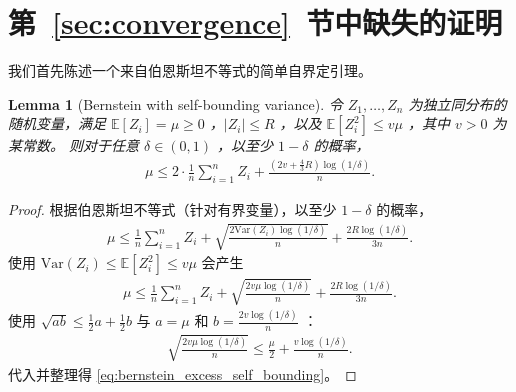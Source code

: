 \documentclass{article}
\theoremstyle{plain}
\newtheorem{lemma}[theorem]{Lemma}
\theoremstyle{definition}
\theoremstyle{remark}
\newcommand{\E}{\mathbb{E}}
\newcommand{\Var}{\mathrm{Var}}
\newcommand{\abs}[1]{\left|#1\right|}
\begin{document}
\section{第~\ref{sec:convergence}~节中缺失的证明}
我们首先陈述一个来自伯恩斯坦不等式的简单自界定引理。

\begin{lemma}[Bernstein with self-bounding variance]\label{lem:bernstein_excess_self_bounding}
    令 $Z_1,\dots,Z_n$ 为独立同分布的随机变量，满足 $\E[Z_i]=\mu\geq 0$ ，$\abs{Z_i}\leq R$ ，以及 $\E[Z_i^2]\leq v\mu$ ，其中 $v>0$ 为某常数。  
则对于任意 $\delta\in(0,1)$ ，以至少 $1-\delta$ 的概率，
    \begin{align}\label{eq:bernstein_excess_self_bounding}
        \mu\leq 2\cdot \frac{1}{n}\sum_{i=1}^n Z_i +\frac{(2v+\frac{4}{3}R)\log(1/\delta)}{n}.
    \end{align}
\end{lemma}
\begin{proof}
    根据伯恩斯坦不等式（针对有界变量），以至少 $1-\delta$ 的概率，
    \begin{align*}
        \mu\leq\frac{1}{n}\sum_{i=1}^n Z_i+\sqrt{\frac{2\Var(Z_i)\log(1/\delta)}{n}}+\frac{2R\log(1/\delta)}{3n}.
    \end{align*}
    使用 $\Var(Z_i)\leq \E[Z_i^2]\leq v\mu$ 会产生
    \begin{align*}
        \mu\leq
        \frac{1}{n}\sum_{i=1}^n Z_i +\sqrt{\frac{2v\mu\log(1/\delta)}{n}} +\frac{2R\log(1/\delta)}{3n}.
    \end{align*}
    使用 $\sqrt{ab}\leq \frac{1}{2}a+\frac{1}{2}b$ 与 $a=\mu$ 和 $b=\frac{2v\log(1/\delta)}{n}$ ：
    \begin{align*}
        \sqrt{\frac{2v\mu\log(1/\delta)}{n}}\leq\frac{\mu}{2}+\frac{v\log(1/\delta)}{n}.
    \end{align*}
    代入并整理得 \eqref{eq:bernstein_excess_self_bounding}。
\end{proof}
\end{document}
